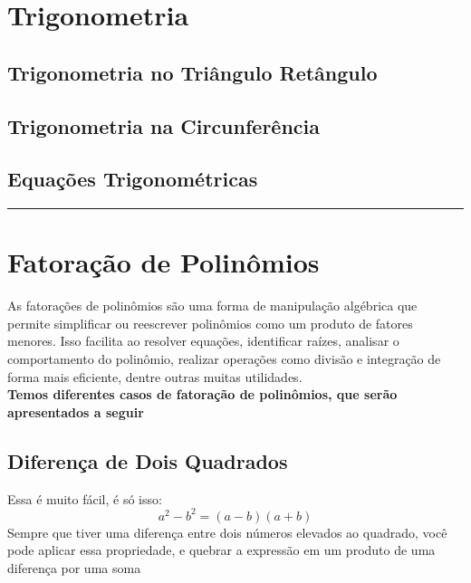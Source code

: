 \documentclass{article}
\begin{document}
\section{Trigonometria}

\subsection{Trigonometria no Triângulo Retângulo}

\subsection{Trigonometria na Circunferência}

\subsection{Equações Trigonométricas}

\vspace{15pt}
\hrule

\section{Fatoração de Polinômios}
As fatorações de polinômios são uma forma de manipulação algébrica que permite simplificar ou reescrever polinômios como um produto de fatores menores. Isso facilita ao resolver equações, identificar raízes, analisar o comportamento do polinômio, realizar operações como divisão e integração de forma mais eficiente, dentre outras muitas utilidades.
\\[10pt]
\textbf{Temos diferentes casos de fatoração de polinômios, que serão apresentados a seguir}
\subsection{Diferença de Dois Quadrados}
Essa é muito fácil, é só isso:
\[
a^2 - b^2 = (a - b)(a + b)
\]
Sempre que tiver uma diferença entre dois números elevados ao quadrado, você pode aplicar essa propriedade, e quebrar a expressão em um produto de uma diferença por uma soma
\end{document}
